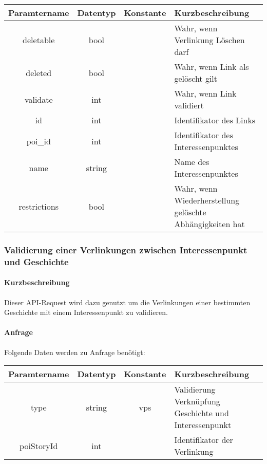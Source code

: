 \begin{table}[H]
	\begin{tabular}{|c|c|c|p{6.5cm}|}
		\hline
		\textbf{Paramtername} & \textbf{Datentyp} & \textbf{Konstante} & \textbf{Kurzbeschreibung}    \\ \hline
		deletable              & bool            &                 & Wahr, wenn Verlinkung Löschen darf \\ \hline
		deleted                & bool            &                 & Wahr, wenn Link als gelöscht gilt \\ \hline
		validate               & int             &                 & Wahr, wenn Link validiert \\ \hline
		id                     & int             &                 & Identifikator des Links \\ \hline
		poi\_id                & int             &                 & Identifikator des Interessenpunktes \\ \hline
		name                   & string          &                 & Name des Interessenpunktes \\ \hline
		restrictions           & bool            &                 & Wahr, wenn Wiederherstellung gelöschte Abhängigkeiten hat \\ \hline
	\end{tabular}
\end{table}
\subsubsection{Validierung einer Verlinkungen zwischen Interessenpunkt und Geschichte}
\paragraph{Kurzbeschreibung}Dieser API-Request wird dazu genutzt um die Verlinkungen einer bestimmten Geschichte mit einem Interessenpunkt zu validieren.
\paragraph{Anfrage}Folgende Daten werden zu Anfrage benötigt:
\begin{table}[H]
	\begin{tabular}{|c|c|c|p{6.5cm}|}
		\hline
		\textbf{Paramtername} & \textbf{Datentyp} & \textbf{Konstante} & \textbf{Kurzbeschreibung}                                                                                               \\ \hline
		type                & string            & vps                & Validierung Verknüpfung Geschichte und Interessenpunkt \\ \hline
		poiStoryId          & int               &                    & Identifikator der Verlinkung \\ \hline
	\end{tabular}
\end{table}
